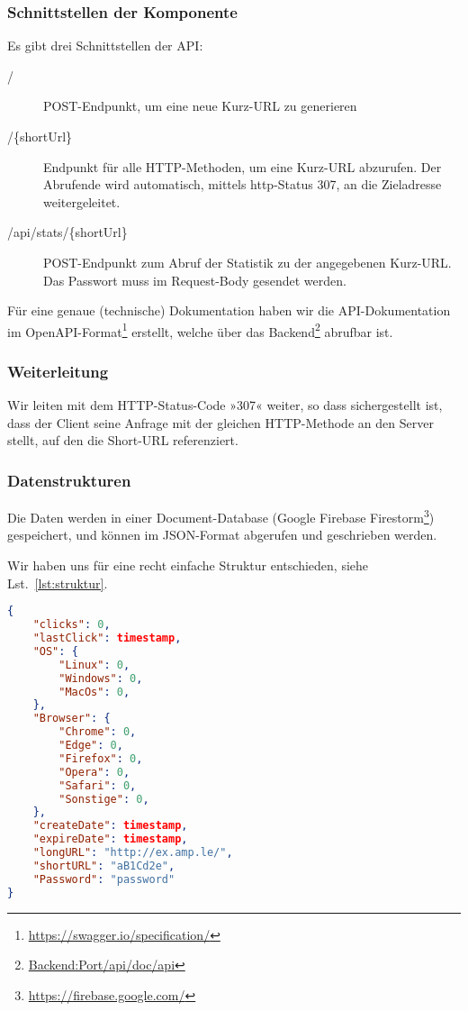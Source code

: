 \documentclass[a4paper,11pt,DIV=12,overfullrule=on]{scrreprt}%
\begin{document}
\subsubsection{Schnittstellen der Komponente}
Es gibt drei Schnittstellen der \ac{API}:
\begin{description}
    \item[/] POST-Endpunkt, um eine neue Kurz-\ac{URL} zu generieren
    \item[/\{shortUrl\}] Endpunkt für alle HTTP-Methoden, um eine Kurz-\ac{URL} abzurufen. Der Abrufende wird automatisch, mittels http-Status 307, an die Zieladresse weitergeleitet.
    \item[/api/stats/\{shortUrl\}] POST-Endpunkt zum Abruf der Statistik zu der angegebenen Kurz-\ac{URL}. Das Passwort muss im Request-Body gesendet werden.
\end{description}
Für eine genaue (technische) Dokumentation haben wir die \ac{API}-Dokumentation im OpenAPI-Format\footnote{\href{https://swagger.io/specification/}{https://swagger.io/specification/}} erstellt, welche über das Backend\footnote{\href{http://localhost:8080/api/doc/api}{Backend:Port/api/doc/api}} abrufbar ist.
\subsubsection{Weiterleitung}
Wir leiten mit dem HTTP-Status-Code »307« weiter, so dass sichergestellt ist, dass der Client seine Anfrage mit der gleichen HTTP-Methode an den Server stellt, auf den die Short-\ac{URL} referenziert.
\subsubsection{Datenstrukturen}
Die Daten werden in einer Document-Database (Google Firebase Firestorm\footnote{\href{https://firebase.google.com/}{https://firebase.google.com/}}) gespeichert, und können im \ac{JSON}-Format abgerufen und geschrieben werden.

Wir haben uns für eine recht einfache Struktur entschieden, siehe Lst.~\ref{lst:struktur}.
\begin{lstlisting}[language=json,
    float=h,
    caption={Aufbau der Datenstruktur für jede Kurz-Url},
    label={lst:struktur}]
{
    "clicks": 0,
    "lastClick": timestamp,
    "OS": {
        "Linux": 0,
        "Windows": 0,
        "MacOs": 0,
    },
    "Browser": {
        "Chrome": 0,
        "Edge": 0,
        "Firefox": 0,
        "Opera": 0,
        "Safari": 0,
        "Sonstige": 0,
    },
    "createDate": timestamp,
    "expireDate": timestamp,
    "longURL": "http://ex.amp.le/",
    "shortURL": "aB1Cd2e",
    "Password": "password"
}
\end{lstlisting}
\end{document}
